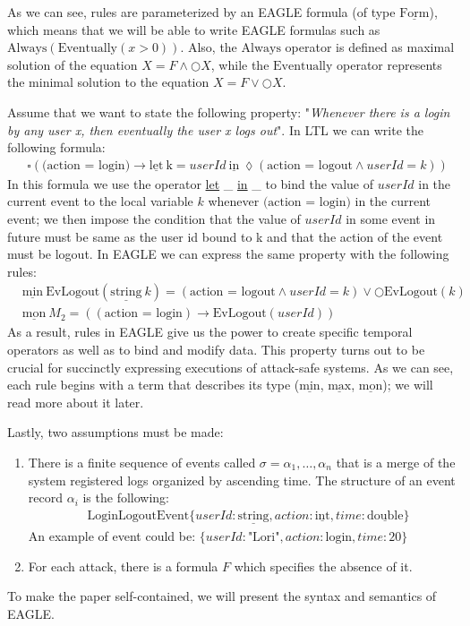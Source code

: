 \documentclass[english]{article}
\begin{document}
As we can see, rules are parameterized by an EAGLE formula (of type $\underline{\text{Form}}$), which means that we will be able to write EAGLE formulas such as $\text{Always}(\text{Eventually}(x>0))$. Also, the $\text{Always}$ operator is defined as maximal solution of the equation $X=F\land \bigcirc X$, while the $\text{Eventually}$ operator represents the minimal solution to the equation $X=F\lor \bigcirc X$.

Assume that we want to state the following property: "\textit{Whenever there is a login by any user x, then eventually the user x logs out}". In LTL we can write the following formula: 
\begin{align*}
    & \square{(\text{(action = login)}\rightarrow \underline{\text{let}}\ \text{k} =userId\ \underline{\text{in}}\ \lozenge(\text{action = logout}\land userId = k))}
\end{align*}
In this formula we use the operator \underline{let} \_ \underline{in} \_ to bind the value of $userId$ in the current event to the local variable $k$ whenever $\text{(action = login)}$ in the current event; we then impose the condition that the value of $userId$ in some event in future must be same as the user id bound to k and that the action of the event must be logout.
In EAGLE we can express the same property with the following rules:
\begin{align*}
    & \underline{\text{min}}\ \text{EvLogout}(\underline{\text{string}}\ k) = (\text{action = logout}\land userId = k) \lor \bigcirc \text{EvLogout}(k) \\
    & \underline{\text{mon}}\ M_2 = ((\text{action = login})\rightarrow \text{EvLogout}(userId)) 
\end{align*}
As a result, rules in EAGLE give us the power to create specific temporal operators as well as to bind and modify data. This property turns out to be crucial for succinctly expressing executions of attack-safe systems. As we can see, each rule begins with a term that describes its type ($\underline{\text{min}}$, $\underline{\text{max}}$, $\underline{\text{mon}}$); we will read more about it later.

Lastly, two assumptions must be made:\begin{enumerate}
    \item There is a finite sequence of events called $\sigma=\alpha_{1},\ldots ,\alpha_{n}$ that is a merge of the system registered logs organized by ascending time. 
    The structure of an event record $\alpha_i$ is the following:
    \begin{align*}
        & \text{LoginLogoutEvent}\{userId:\underline{\text{string}},action: \underline{\text{int}}, time: \underline{\text{double}}\} 
    \end{align*}
    An example of event could be: $\{userId:\text{"Lori"},action:\text{login},time:\text{20}\}$
    \item For each attack, there is a formula $F$ which specifies the absence of it.
\end{enumerate}
To make the paper self-contained, we will present the syntax and semantics of EAGLE.
\end{document}
